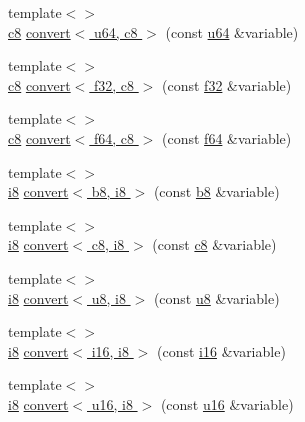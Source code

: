 \begin{DoxyCompactItemize}
\item 
{\footnotesize template$<$$>$ }\\\hyperlink{types_8h_aa1ba8aac9fcd831012308297336ac74b}{c8} \hyperlink{namespacecrap_a1144de6d96352930d7aa14feb27147fe}{convert$<$ u64, c8 $>$} (const \hyperlink{types_8h_a3f7e2bcbb0b4c338f3c4f6c937cd4234}{u64} \&variable)
\item 
{\footnotesize template$<$$>$ }\\\hyperlink{types_8h_aa1ba8aac9fcd831012308297336ac74b}{c8} \hyperlink{namespacecrap_a37f1f6a880ed9e84a4e1313656ef4bf1}{convert$<$ f32, c8 $>$} (const \hyperlink{types_8h_a154db6eda6a99565cb060a1da4b4c930}{f32} \&variable)
\item 
{\footnotesize template$<$$>$ }\\\hyperlink{types_8h_aa1ba8aac9fcd831012308297336ac74b}{c8} \hyperlink{namespacecrap_a18516ea96349488fdba3b73a8275493f}{convert$<$ f64, c8 $>$} (const \hyperlink{types_8h_a76c9f53497f766e57b184bc8a93ab73f}{f64} \&variable)
\item 
{\footnotesize template$<$$>$ }\\\hyperlink{types_8h_ae3702327b5f47e83b431e22b33da7b58}{i8} \hyperlink{namespacecrap_a41b18d70d00f74a93db6067c135c2d6b}{convert$<$ b8, i8 $>$} (const \hyperlink{types_8h_a74eb47b4ab9e428eab7b91b3b877fa6c}{b8} \&variable)
\item 
{\footnotesize template$<$$>$ }\\\hyperlink{types_8h_ae3702327b5f47e83b431e22b33da7b58}{i8} \hyperlink{namespacecrap_a87a5b9bf7af1a205ac655bb33a31dab0}{convert$<$ c8, i8 $>$} (const \hyperlink{types_8h_aa1ba8aac9fcd831012308297336ac74b}{c8} \&variable)
\item 
{\footnotesize template$<$$>$ }\\\hyperlink{types_8h_ae3702327b5f47e83b431e22b33da7b58}{i8} \hyperlink{namespacecrap_a9d3fb14d07286df143243c1fce2376bb}{convert$<$ u8, i8 $>$} (const \hyperlink{types_8h_a92c50087ca0e64fa93fc59402c55f8ca}{u8} \&variable)
\item 
{\footnotesize template$<$$>$ }\\\hyperlink{types_8h_ae3702327b5f47e83b431e22b33da7b58}{i8} \hyperlink{namespacecrap_a3fd4b186f4cbfcc1c4046f71c4f3e497}{convert$<$ i16, i8 $>$} (const \hyperlink{types_8h_ad309dbcaeea13aa602d686964156ea0b}{i16} \&variable)
\item 
{\footnotesize template$<$$>$ }\\\hyperlink{types_8h_ae3702327b5f47e83b431e22b33da7b58}{i8} \hyperlink{namespacecrap_afe9c1976aeece39f522b465575ea4c6f}{convert$<$ u16, i8 $>$} (const \hyperlink{types_8h_ace9d960e74685e2cd84b36132dbbf8aa}{u16} \&variable)

\end{DoxyCompactItemize}
